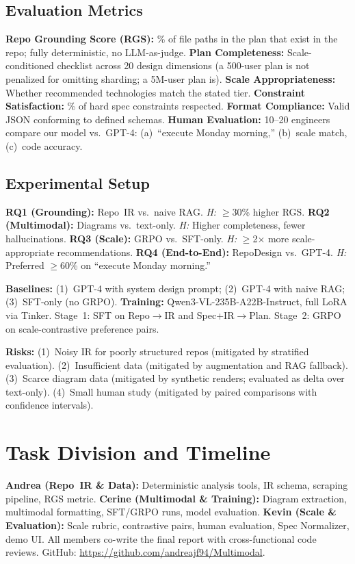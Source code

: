 \documentclass{article}
\begin{document}
\subsection{Evaluation Metrics}
\textbf{Repo Grounding Score (RGS):} \% of file paths in the plan that exist in the repo; fully deterministic, no LLM-as-judge.
\textbf{Plan Completeness:} Scale-conditioned checklist across 20 design dimensions (a 500-user plan is not penalized for omitting sharding; a 5M-user plan is).
\textbf{Scale Appropriateness:} Whether recommended technologies match the stated tier.
\textbf{Constraint Satisfaction:} \% of hard spec constraints respected.
\textbf{Format Compliance:} Valid JSON conforming to defined schemas.
\textbf{Human Evaluation:} 10--20 engineers compare our model vs.\ GPT-4: (a)~``execute Monday morning,'' (b)~scale match, (c)~code accuracy.

\subsection{Experimental Setup}
\textbf{RQ1 (Grounding):} Repo~IR vs.\ naive RAG. \emph{H:} $\geq$30\% higher RGS.
\textbf{RQ2 (Multimodal):} Diagrams vs.\ text-only. \emph{H:} Higher completeness, fewer hallucinations.
\textbf{RQ3 (Scale):} GRPO vs.\ SFT-only. \emph{H:} $\geq$2$\times$ more scale-appropriate recommendations.
\textbf{RQ4 (End-to-End):} RepoDesign vs.\ GPT-4. \emph{H:} Preferred $\geq$60\% on ``execute Monday morning.''

\textbf{Baselines:} (1)~GPT-4 with system design prompt; (2)~GPT-4 with naive RAG; (3)~SFT-only (no GRPO).
\textbf{Training:} Qwen3-VL-235B-A22B-Instruct, full LoRA via Tinker. Stage~1: SFT on Repo$\to$IR and Spec+IR$\to$Plan. Stage~2: GRPO on scale-contrastive preference pairs.

\textbf{Risks:} (1)~Noisy IR for poorly structured repos (mitigated by stratified evaluation). (2)~Insufficient data (mitigated by augmentation and RAG fallback). (3)~Scarce diagram data (mitigated by synthetic renders; evaluated as delta over text-only). (4)~Small human study (mitigated by paired comparisons with confidence intervals).

\section{Task Division and Timeline}

\textbf{Andrea (Repo~IR \& Data):} Deterministic analysis tools, IR schema, scraping pipeline, RGS metric.
\textbf{Cerine (Multimodal \& Training):} Diagram extraction, multimodal formatting, SFT/GRPO runs, model evaluation.
\textbf{Kevin (Scale \& Evaluation):} Scale rubric, contrastive pairs, human evaluation, Spec Normalizer, demo UI.
All members co-write the final report with cross-functional code reviews. GitHub: \url{https://github.com/andreajf94/Multimodal}.
\end{document}
